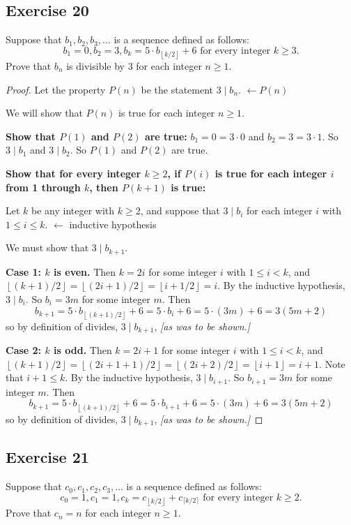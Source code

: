 \documentclass[14pt]{extarticle}
\newcommand{\dps}{\displaystyle}
\newcommand{\from}{\leftarrow}
\newcommand{\floor}[1]{{\left\lfloor#1\right\rfloor}}
\newcommand{\ceil}[1]{{\lceil#1\rceil}}
\newcommand{\cy}{\color{cyan}}
\begin{document}
\subsection{Exercise 20}
Suppose that $b_1, b_2, b_3, \ldots$ is a sequence defined as follows:
\[
b_1 = 0, b_2 = 3, b_k = 5 \cdot b_{\floor{k/2}} + 6 \text{ for every integer } k \geq 3.
\]
Prove that $b_n$ is divisible by 3 for each integer $n \geq 1$.

\begin{proof}
Let the property $P(n)$ be the statement $3 \mid b_n$. {\cy $\from P(n)$} 

We will show that $P(n)$ is true for each integer $n \geq 1$. 

{\bf Show that $P(1)$ and $P(2)$ are true:} 
$b_1 = 0 = 3 \cdot 0$ and $b_2 = 3 = 3 \cdot 1$. 
So $3 \mid b_1$ and $3 \mid b_2$. 
So $P(1)$ and $P(2)$ are true.

{\bf Show that for every integer $k \geq 2$, if $P(i)$ is
true for each integer $i$ from 1 through $k$, then $P(k + 1)$ is true:}

Let $k$ be any integer with $k \geq 2$, and suppose that
$3 \mid b_i$ for each integer $i$ with $1 \leq i \leq k$.
{\cy $\from$ inductive hypothesis}

We must show that $3 \mid b_{k+1}$. 

{\bf Case 1: $k$ is even.} 
Then $k = 2i$ for some integer $i$ with $1 \leq i < k$, and
$\dps \floor{(k+1)/2} = \floor{(2i+1)/2} = \floor{i+1/2} = i$.
By the inductive hypothesis, $3 \mid b_i$. So $b_i = 3m$ for some integer $m$. Then
\[
b_{k+1} = 5 \cdot b_{\floor{(k + 1)/2}} + 6 = 5 \cdot b_i + 6 = 5 \cdot (3m) + 6 = 3(5m + 2)
\]
so by definition of divides, $3 \mid b_{k+1}$, {\it [as was to be shown.]}

{\bf Case 2: $k$ is odd.} 
Then $k = 2i + 1$ for some integer $i$ with $1 \leq i < k$,
and $\dps \floor{(k + 1)/2} = \floor{(2i + 1 + 1)/2} = \floor{(2i + 2)/2} = \floor{i+1}= i+1$. 
Note that $i + 1 \leq k$.
By the inductive hypothesis, $3 \mid b_{i + 1}$. So $b_{i + 1} = 3m$ for some integer $m$. Then
\[
b_{k+1} = 5 \cdot b_{\floor{(k + 1)/2}} + 6 = 5 \cdot b_{i + 1} + 6 = 5 \cdot (3m) + 6 = 3(5m + 2)
\]
so by definition of divides, $3 \mid b_{k+1}$, {\it [as was to be shown.]}
\end{proof}

\subsection{Exercise 21}
Suppose that $c_0, c_1, c_2, c_3, \ldots$ is a sequence defined as follows:
\[
c_0 = 1, c_1 = 1, c_k = c_{\floor{k/2}} + c_{\ceil{k/2}}  \text{ for every integer } k \geq 2.
\]
Prove that $c_n = n$ for each integer $n \geq 1$.
\end{document}
